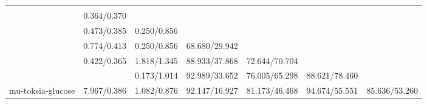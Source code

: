 \begin{tabular}{lrrrrr}
\toprule
{} &        &        &          &          &          &          \\
\midrule
{}            &              &              &                &                &                &                \\
            &  0.364/0.370 &              &                &                &                &                \\
            &  0.473/0.385 &  0.250/0.856 &                &                &                &                \\
            &  0.774/0.413 &  0.250/0.856 &  68.680/29.942 &                &                &                \\
            &  0.422/0.365 &  1.818/1.345 &  88.933/37.868 &  72.644/70.704 &                &                \\
            &              &  0.173/1.014 &  92.989/33.652 &  76.005/65.298 &  88.621/78.460 &                \\
mu-toksia-glucose &  7.967/0.386 &  1.082/0.876 &  92.147/16.927 &  81.173/46.468 &  94.674/55.551 &  85.636/53.260 \\
\bottomrule
\end{tabular}
